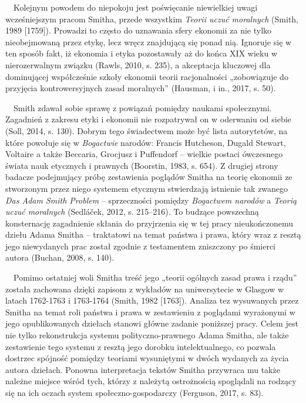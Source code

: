 \documentclass[a4paper]{article}
\begin{document}
 \ \ Kolejnym powodem do niepokoju jest poświęcanie niewielkiej uwagi wcześniejszym pracom Smitha, przede wszystkim
\textit{Teorii uczuć moralnych }\label{ref:RNDuvnqXhGdwl}(Smith, 1989 [1759]). Prowadzi to często do uznawania sfery
ekonomii za nie tylko nieobejmowaną przez etykę, lecz wręcz znajdującą się ponad nią. Ignoruje się w ten sposób fakt,
iż ekonomia i etyka pozostawały aż do końca XIX wieku w nierozerwalnym związku \label{ref:RNDifRkgFWC39}(Rawls, 2010,
s. 235), a akceptacja kluczowej dla dominującej współcześnie szkoły ekonomii teorii racjonalności „zobowiązuje do
przyjęcia kontrowersyjnych zasad moralnych” \label{ref:RNDHRnH8e5vNp}(Hausman, i in., 2017, s. 50). 

 \ \ Smith zdawał sobie sprawę z powiązań pomiędzy naukami społecznymi. Zagadnień z zakresu etyki i ekonomii nie
rozpatrywał on w oderwaniu od siebie \label{ref:RNDc7lad85KL1}(Soll, 2014, s. 130). Dobrym tego świadectwem może być
lista autorytetów, na które powołuje się w \textit{Bogactwie }narodów: Francis Hutcheson, Dugald Stewart, Voltaire a
także Beccaria, Grocjusz i Puffendorf – wielkie postaci ówczesnego świata nauk etycznych i prawnych
\label{ref:RNDYwU1DwRdXl}(Boorstin, 1983, s. 654). Z drugiej strony badacze podejmujący próbę zestawienia poglądów
Smitha na teorię ekonomii ze stworzonym przez niego systemem etycznym stwierdzają istnienie tak zwanego \textit{Das
Adam Smith Problem} – sprzeczności pomiędzy \textit{Bogactwem narodów} a \textit{Teorią uczuć moralnych
}\label{ref:RNDVh9gEUItJS}(Sedláček, 2012, s. 215–216). To budzące powszechną konsternację zagadnienie skłania do
przyjrzenia się w tej pracy nieukończonemu dziełu Adama Smitha – traktatowi na temat państwa i prawa, który wraz z
resztą jego niewydanych prac został zgodnie z testamentem zniszczony po śmierci autora
\label{ref:RNDsGGYAWrkxh}(Buchan, 2008, s. 140). 

 \ \ Pomimo ostatniej woli Smitha treść jego „teorii ogólnych zasad prawa i rządu” została zachowana dzięki zapisom z
wykładów na uniwersytecie w Glasgow w latach 1762-1763 i 1763-1764 \label{ref:RNDDaJwKBJe61}(Smith, 1982 [1763]).
Analiza tez wysuwanych przez Smitha na temat roli państwa i prawa w zestawieniu z poglądami wyrażonymi w jego
opublikowanych dziełach stanowi główne zadanie poniższej pracy. Celem jest nie tylko rekonstrukcja systemu
polityczno-prawnego Adama Smitha, ale także zestawienie tego systemu z resztą jego dorobku intelektualnego, co pozwala
dostrzec spójność pomiędzy teoriami wysuniętymi w dwóch wydanych za życia autora dziełach. Ponowna interpretacja
tekstów Smitha przywraca mu także należne miejsce wśród tych, którzy z należytą ostrożnością spoglądali na rodzący się
na ich oczach system społeczno-gospodarczy \label{ref:RNDsLlADmbRUC}(Ferguson, 2017, s. 83).
\end{document}
